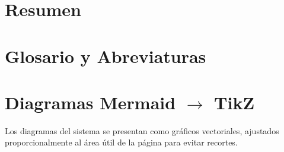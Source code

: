 


\def\documenttitle{Informe Técnico}




\clearpage

\chapter*{Resumen}

\clearpage

\tableofcontents
\clearpage

\listoffigures
\clearpage
\listoftables
\clearpage

\chapter*{Glosario y Abreviaturas}

\clearpage





















\clearpage
\printbibliography[heading=bibintoc,title={Referencias Bibliográficas}]

\appendix
\chapter{Diagramas Mermaid $\to$ TikZ}
\label{ap:diagramas}
Los diagramas del sistema se presentan como gráficos vectoriales, ajustados
proporcionalmente al área útil de la página para evitar recortes.

